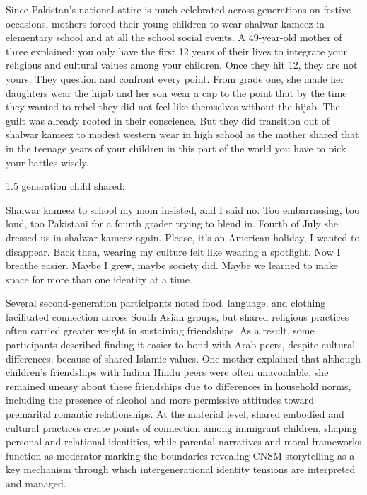 Since Pakistan’s national attire is much celebrated across generations on festive occasions, mothers forced their young children to wear shalwar kameez in elementary school and at all the school social events. A 49-year-old mother of three explained; you only have the first 12 years of their lives to integrate your religious and cultural values among your children. Once they hit 12, they are not yours. They question and confront every point. From grade one, she made her daughters wear the hijab and her son wear a cap to the point that by the time they wanted to rebel they did not feel like themselves without the hijab. The guilt was already rooted in their conscience. But they did transition out of shalwar kameez to modest western wear in high school as the mother shared that in the teenage years of your children in this part of the world you have to pick your battles wisely.

1.5 generation child shared:

\begin{FoundPoem}
Shalwar kameez to school
my mom insisted,
and I said no.
Too embarrassing,
too loud,
too Pakistani
for a fourth grader trying to blend in.
Fourth of July
she dressed us in shalwar kameez again.
Please, it’s an American holiday,
I wanted to disappear.
Back then,
wearing my culture felt
like wearing a spotlight.
Now
I breathe easier.
Maybe I grew,
maybe society did.
Maybe we learned
to make space
for more than one identity
at a time.
\end{FoundPoem}

Several second-generation participants noted food, language, and clothing facilitated connection across South Asian groups, but shared religious practices often carried greater weight in sustaining friendships. As a result, some participants described finding it easier to bond with Arab peers, despite cultural differences, because of shared Islamic values. One mother explained that although children’s friendships with Indian Hindu peers were often unavoidable, she remained uneasy about these friendships due to differences in household norms, including the presence of alcohol and more permissive attitudes toward premarital romantic relationships. At the material level, shared embodied and cultural practices create points of connection among immigrant children, shaping personal and relational identities, while parental narratives and moral frameworks function as moderator marking the boundaries revealing CNSM storytelling as a key mechanism through which intergenerational identity tensions are interpreted and managed.

